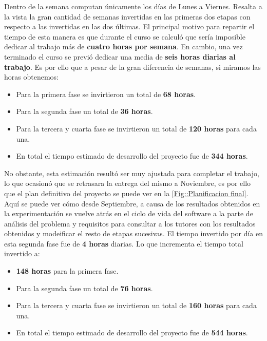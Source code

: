     \medskip

    \noindent Dentro de la semana computan únicamente los días de Lunes a Viernes. Resalta a la vista la gran cantidad de semanas invertidas en las primeras dos etapas con respecto a las invertidas en las dos últimas. El principal motivo para repartir el tiempo de esta manera es que durante el curso se calculó que sería imposible dedicar al trabajo más de \textbf{cuatro horas por semana}. En cambio, una vez terminado el curso se previó dedicar una media de \textbf{seis horas diarias al trabajo}. Es por ello que a pesar de la gran diferencia de semanas, si miramos las horas obtenemos:
    
    \begin{itemize}
        \item Para la primera fase se invirtieron un total de \textbf{68 horas}.
        \item Para la segunda fase un total de \textbf{36 horas}.
        \item Para la tercera y cuarta fase se invirtieron un total de \textbf{120 horas} para cada una.
        \item En total el tiempo estimado de desarrollo del proyecto fue de \textbf{344 horas}.
    \end{itemize}
        
    \noindent No obstante, esta estimación resultó ser muy ajustada para completar el trabajo, lo que ocasionó que se retrasara la entrega del mismo a Noviembre, es por ello que el plan definitivo del proyecto se puede ver en la \autoref{Fig::Planificacion final}. Aquí se puede ver cómo desde Septiembre, a causa de los resultados obtenidos en la experimentación se vuelve atrás en el ciclo de vida del software a la parte de análisis del problema y requisitos para consultar a los tutores con los resultados obtenidos y modeificar el resto de etapas sucesivas. El tiempo invertido por día en esta segunda fase fue de \textbf{4 horas} diarias. Lo que incrementa el tiempo total invertido a:

    \begin{itemize}
        \item \textbf{148 horas} para la primera fase.
        \item Para la segunda fase un total de \textbf{76 horas}.
        \item Para la tercera y cuarta fase se invirtieron un total de \textbf{160 horas} para cada una.
        \item En total el tiempo estimado de desarrollo del proyecto fue de \textbf{544 horas}.
    \end{itemize}

